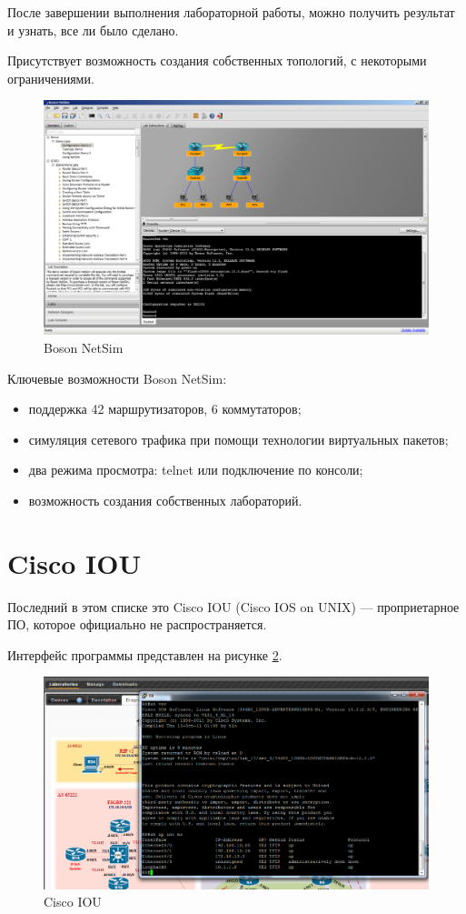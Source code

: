 	После завершении выполнения лабораторной работы, можно получить результат и узнать, все ли было
	сделано.
	
	Присутствует возможность создания собственных топологий, с некоторыми
	ограничениями.
	
	
	\begin{figure}[h!]
		\centering
		\includegraphics[width=0.9\linewidth]{pic/netsim}
		\caption{Boson NetSim}
		\label{fig:netsim}
	\end{figure}
	
	Ключевые возможности Boson NetSim:
	
	\begin{itemize}
		\item поддержка  42 маршрутизаторов, 6 коммутаторов;
		\item симуляция сетевого трафика при помощи технологии виртуальных
		пакетов;
		\item два режима просмотра: telnet или подключение по консоли;
		\item возможность создания собственных лабораторий.
	\end{itemize}
	
	\section{Cisco IOU}
	
	Последний в этом списке это  Cisco IOU (Cisco IOS on UNIX) —
	проприетарное ПО, которое официально не распространяется.
	
	Интерфейс программы представлен на рисунке \ref*{fig:ciscoIOU}.
	
	\begin{figure}[h!]
		\centering
		\includegraphics[width=0.9\linewidth]{pic/ciscoIOU}
		\caption{Cisco IOU}
		\label{fig:ciscoIOU}
	\end{figure}
	
